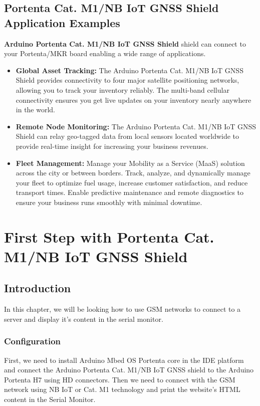 \section{Portenta Cat. M1/NB IoT GNSS Shield Application Examples}


\textbf{Arduino Portenta Cat. M1/NB IoT GNSS Shield} shield can connect to your Portenta/MKR board enabling a wide range of applications. \cite{ArduinoPortenta:2024}
\begin{itemize}
	\item \textbf{Global Asset Tracking:} The Arduino Portenta Cat. M1/NB IoT GNSS Shield provides connectivity to four major satellite positioning networks, allowing you to track your inventory reliably. The multi-band cellular connectivity ensures you get live updates on your inventory nearly anywhere in the world.
	\item \textbf{Remote Node Monitoring:} The Arduino Portenta Cat. M1/NB IoT GNSS Shield can relay geo-tagged data from local sensors located worldwide to provide real-time insight for increasing your business revenues.
	\item \textbf{Fleet Management:} Manage your Mobility as a Service (MaaS) solution across the city or between borders. Track, analyze, and dynamically manage your fleet to optimize fuel usage, increase customer satisfaction, and reduce transport times. Enable predictive maintenance and remote diagnostics to ensure your business runs smoothly with minimal downtime.
\end{itemize}

\chapter{First Step with Portenta Cat. M1/NB IoT GNSS Shield}

\section{Introduction}
In this chapter, we will be looking how to use GSM networks to connect to a server and display it's content in the serial monitor. \cite{ArduinoPortentaSketch:2024}

\subsection{Configuration}
First, we need to install Arduino Mbed OS Portenta core in the IDE platform and connect the Arduino Portenta Cat. M1/NB IoT GNSS shield to the Arduino Portenta H7 using HD connectors. Then we need to connect with the GSM network using NB IoT or Cat. M1 technology and print the website's HTML content in the Serial Monitor.  	

